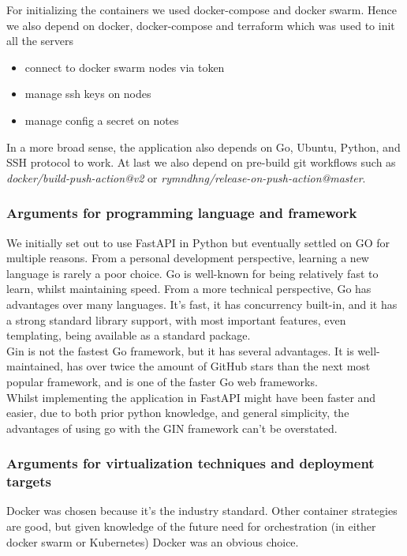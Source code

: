 For initializing the containers we used docker-compose and docker swarm. Hence we also depend on docker, docker-compose
and terraform which was used to init all the servers
\begin{itemize}
    \item connect to docker swarm nodes via token
    \item manage ssh keys on nodes 
    \item manage config a secret on notes
\end{itemize}

In a more broad sense, the application also depends on Go, Ubuntu, Python, and SSH protocol to work. At last we 
also depend on pre-build git workflows such as \textit{docker/build-push-action@v2} or \textit{rymndhng/release-on-push-action@master}.

\subsubsection{Arguments for programming language and framework}
We initially set out to use FastAPI in Python but eventually settled on GO for multiple reasons. From a personal 
development perspective, learning a new language is rarely a poor choice. Go is well-known for being relatively 
fast to learn, whilst maintaining speed. From a more technical perspective, Go has advantages over many languages. 
It's fast, it has concurrency built-in, and it has a strong standard library support, with most important features, 
even templating, being available as a standard package.\\

Gin is not the fastest Go framework, but it has several advantages. It is well-maintained, has over twice the 
amount of GitHub stars than the next most popular framework, and is one of the faster Go web frameworks.\\

Whilst implementing the application in FastAPI might have been faster and easier, due to both prior python 
knowledge, and general simplicity, the advantages of using go with the GIN framework can't be overstated. 

\subsubsection{Arguments for virtualization techniques and deployment targets}
Docker was chosen because it's the industry standard. Other container strategies are good, but given knowledge 
of the future need for orchestration (in either docker swarm or Kubernetes) Docker was an obvious choice.\\

